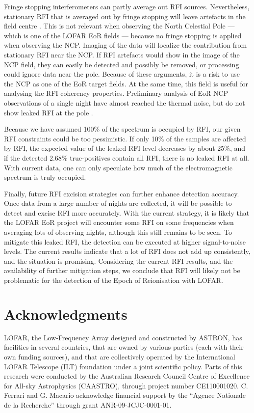 \documentclass[useAMS,usenatbib]{mn2e}
\DeclareRobustCommand{\TUSSEN}[3]{#2}
\begin{document}
Fringe stopping interferometers can partly average out RFI sources. Nevertheless, stationary RFI that is averaged out by fringe stopping will leave artefacts in the field centre \citep{post-correlation-filtering}. This is not relevant when observing the North Celestial Pole --- which is one of the LOFAR EoR fields --- because no fringe stopping is applied when observing the NCP. Imaging of the data will localize the contribution from stationary RFI near the NCP. If RFI artefacts would show in the image of the NCP field, they can easily be detected and possibly be removed, or processing could ignore data near the pole. Because of these arguments, it is a risk to use the NCP as one of the EoR target fields. At the same time, this field is useful for analysing the RFI coherency properties. Preliminary analysis of EoR NCP observations of a single night have almost reached the thermal noise, but do not show leaked RFI at the pole \citep[\S4.3]{ncp-eor-yatawatta}.

Because we have assumed 100\% of the spectrum is occupied by RFI, our given RFI constraints could be too pessimistic. If only 10\% of the samples are affected by RFI, the expected value of the leaked RFI level decreases by about $25$\%, and if the detected 2.68\% true-positives contain all RFI, there is no leaked RFI at all. With current data, one can only speculate how much of the electromagnetic spectrum is truly occupied.

Finally, future RFI excision strategies can further enhance detection accuracy. Once data from a large number of nights are collected, it will be possible to detect and excise RFI more accurately. With the current strategy, it is likely that the LOFAR EoR project will encounter some RFI on some frequencies when averaging lots of observing nights, although this still remains to be seen. To mitigate this leaked RFI, the detection can be executed at higher signal-to-noise levels. The current results indicate that a lot of RFI does not add up consistently, and the situation is promising. Considering the current RFI results, and the availability of further mitigation steps, we conclude that RFI will likely not be problematic for the detection of the Epoch of Reionisation with LOFAR.

\section*{Acknowledgments}
LOFAR, the Low-Frequency Array designed and constructed by ASTRON, has facilities in several countries, that are owned by various parties (each with their own funding sources), and that are collectively operated by the International LOFAR Telescope (ILT) foundation under a joint scientific policy. Parts of this research were conducted by the Australian Research Council Centre of Excellence for All-sky Astrophysics (CAASTRO), through project number CE110001020. C. Ferrari and G. Macario acknowledge financial support by the ``Agence Nationale de la Recherche'' through grant ANR-09-JCJC-0001-01.

\DeclareRobustCommand{\TUSSEN}[3]{#3}




\label{lastpage}
\end{document}
